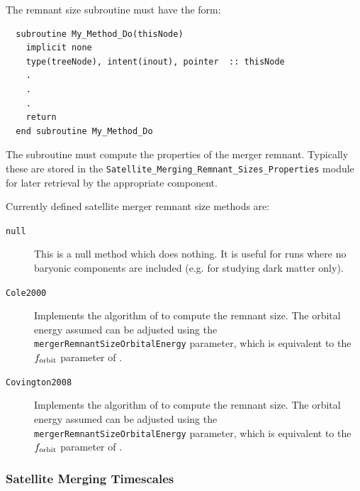 The remnant size subroutine must have the form:
\begin{verbatim}
  subroutine My_Method_Do(thisNode)
    implicit none
    type(treeNode), intent(inout), pointer  :: thisNode
    .
    .
    .
    return
  end subroutine My_Method_Do
\end{verbatim}
The subroutine must compute the properties of the merger remnant. Typically these are stored in the {\tt Satellite\_Merging\_Remnant\_Sizes\_Properties} module for later retrieval by the appropriate component.

Currently defined satellite merger remnant size methods are:
\begin{description}
 \item [{\tt null}] This is a null method which does nothing. It is useful for runs where no baryonic components are included (e.g. for studying dark matter only).
 \item [{\tt Cole2000}] Implements the algorithm of \cite{cole_hierarchical_2000} to compute the remnant size. The orbital energy assumed can be adjusted using the {\tt mergerRemnantSizeOrbitalEnergy} parameter, which is equivalent to the $f_{\rm orbit}$ parameter of \cite{cole_hierarchical_2000}.
 \item [{\tt Covington2008}] Implements the algorithm of \cite{covington_predicting_2008} to compute the remnant size. The orbital energy assumed can be adjusted using the {\tt mergerRemnantSizeOrbitalEnergy} parameter, which is equivalent to the $f_{\rm orbit}$ parameter of \cite{cole_hierarchical_2000}.
\end{description}

\subsubsection{Satellite Merging Timescales}

